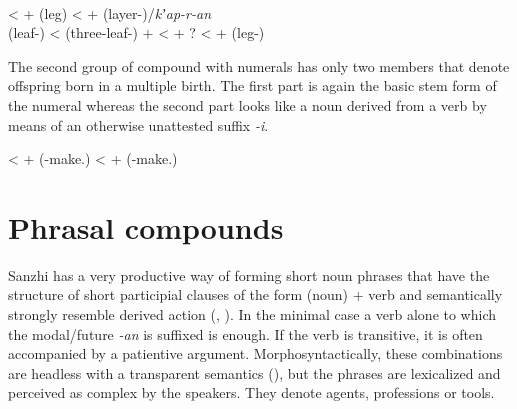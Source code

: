\begin{exe}
	\ex	\label{ex:CompoundNounsNumeralsNouns} 
	\begin{xlist}
		\TabPositions{2em,4em}
			\ex	{}			\\
			\tab	<	\tab	 {}  +  (leg)										
			\ex	{}			\tab	<	\tab	 {}  +  (layer-)\slash\textit{kʼap-r-an} \\
			(leaf-)
			\ex	{}			\tab	<	\tab	 {} (three-leaf-) +  
			\ex	{}			\tab	<	\tab	{}  + ?	
			\ex	{}			\tab	<	\tab	{}  +  (leg-)						
	\end{xlist}
\end{exe}	

The second group of compound  with numerals has only two members  that denote offspring born in a multiple birth. The first part is again the basic stem form of the numeral whereas the second part looks like a noun derived from a verb by means of an otherwise unattested suffix \textit{-i}.

\begin{exe}
	\ex	\label{ex:CompoundNounsNumerals2} 
	\begin{xlist}
		\TabPositions{9em,11em}					
			\ex	{}			\tab	<	\tab	 {}  +  (\tsc{npl}-make.\tsc{pfv-?}) 
			\ex	{}				\tab	<	\tab	 {}  +  (\tsc{npl}-make.\tsc{pfv-?}) 
	\end{xlist}
\end{exe}	



\section{Phrasal compounds}
\label{ssec:N-genN}
Sanzhi has a very productive way of forming short noun phrases that have the structure of short participial clauses of the form (noun) + verb and semantically strongly resemble derived action  (, ). In the minimal case a verb alone to which the modal/future  \textit{-an} is suffixed is enough. If the verb is transitive, it is often accompanied by a patientive argument. Morphosyntactically, these combinations are headless  with a transparent semantics (), but the phrases are lexicalized and perceived as complex  by the speakers. They denote agents, professions or tools.

